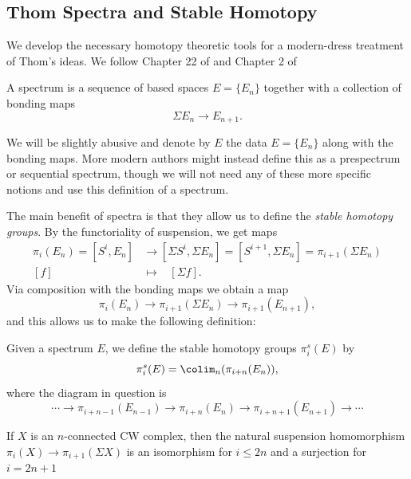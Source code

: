 \subsection{Thom Spectra and Stable Homotopy}
We develop the necessary homotopy theoretic tools for a modern-dress treatment of Thom's ideas. We follow Chapter 22 of \cite{maybook} and Chapter 2 of \cite{malkiewich}
\begin{definition}[Spectrum]
    A spectrum is a sequence of based spaces $E=\{E_n\}$ together with a collection of bonding maps 
    \[\Sigma E_n\to E_{n+1}.\]
\end{definition}
We will be slightly abusive and denote by $E$ the data $E=\{E_n\}$ along with the bonding maps. More modern authors might instead define this as a prespectrum or sequential spectrum, though we will not need any of these more specific notions and use this definition of a spectrum. 

The main benefit of spectra is that they allow us to define the \textit{stable homotopy groups}. By the functoriality of suspension, we get maps
\begin{align*}
    \pi_i(E_n)=[S^i, E_n]&\to [\Sigma S^i, \Sigma E_n]=[S^{i+1}, \Sigma E_n]=\pi_{i+1}(\Sigma E_{n})\\
    [f]\hspace{10pt}&\mapsto \hspace{10pt}[\Sigma f].
\end{align*}
Via composition with the bonding maps we obtain a map
\[\pi_i(E_n)\to \pi_{i+1}(\Sigma E_{n})\to \pi_{i+1}(E_{n+1}),\]
and this allows us to make the following definition:
\begin{definition}
    Given a spectrum $E$, we define the stable homotopy groups $\pi_i^s(E)$ by 
    \[\pi_i^s(E)=\colim_n(\pi_{i+n}(E_n)),\]
    where the diagram in question is 
    \[\cdots\to\pi_{i+n-1}(E_{n-1})\to \pi_{i+n}(E_{n})\to \pi_{i+n+1}(E_{n+1})\to \cdots\]
\end{definition}
\begin{theorem}
\label{theorem1/6}
    If $X$ is an $n$-connected CW complex, then the natural suspension homomorphism $\pi_i(X)\to \pi_{i+1}(\Sigma X)$ is an isomorphism for $i\leq 2n$ and a surjection for $i=2n+1$
\end{theorem}

